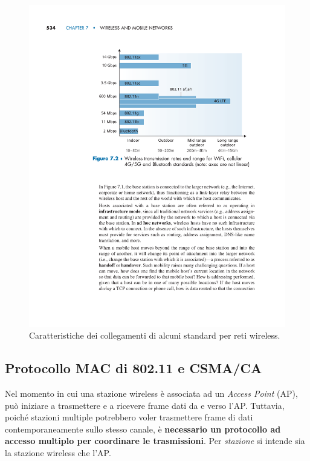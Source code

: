 \documentclass[a4paper]{article}
\begin{document}
	\begin{figure}[!htp]
		\centering
		\includegraphics[width=\textwidth]{img/paragoni_velocita.pdf}
		\caption{Caratteristiche dei collegamenti di alcuni standard per reti wireless.}
		\label{velocità collegamenti}
	\end{figure}\newpage

	\subsection{Protocollo MAC di 802.11 e CSMA/CA}
	
	Nel momento in cui una stazione wireless è associata ad un \emph{Access Point} (AP), può iniziare a trasmettere e a ricevere frame dati da e verso l’AP. Tuttavia, poiché stazioni multiple potrebbero voler trasmettere frame di dati contemporaneamente sullo stesso canale, è \textbf{necessario un protocollo ad accesso multiplo per coordinare le trasmissioni}. Per \emph{stazione} si intende sia la stazione wireless che l’AP.\newline
	
\end{document}
